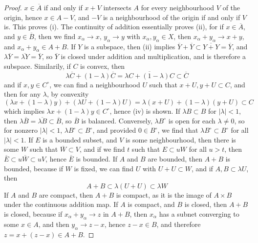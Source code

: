 \begin{proof}
    $x \in \overline{A}$ if and only if $x + V$ intersects $A$ for every neighbourhood $V$ of the origin, hence $x \in A - V$, and $-V$ is a neighbourhood of the origin if and only if $V$ is. This proves (i). The continuity of addition essentially proves (ii), for if $x \in \overline{A}$, and $y \in \overline{B}$, then we find $x_\alpha \to x$, $y_\alpha \to y$ with $x_\alpha, y_\alpha \in X$, then $x_\alpha + y_\alpha \to x + y$, and $x_\alpha + y_\alpha \in A + B$. If $Y$ is a subspace, then (ii) implies $\overline{Y} + \overline{Y} \subset \overline{Y + Y} = \overline{Y}$, and $\lambda \overline{Y} = \overline{\lambda Y} = \overline{Y}$, so $\overline{Y}$ is closed under addition and multiplication, and is therefore a subspace. Similarily, if $C$ is convex, then
    \[ \lambda \overline{C} + (1 - \lambda) \overline{C} = \overline{\lambda C + (1 - \lambda) C} \subset \overline{C} \]
    and if $x,y \in C^\circ$, we can find a neighbourhood $U$ such that $x + U, y + U \subset C$, and then for any $\lambda$, by convexity
    \[ (\lambda x + (1 - \lambda) y) + (\lambda U + (1 - \lambda) U) = \lambda(x + U) + (1 - \lambda)(y + U) \subset C \]
    which implies $\lambda x + (1 - \lambda) y \in C^\circ$, hence (iv) is shown. If $\lambda B \subset B$ for $|\lambda| < 1$, then $\lambda \overline{B} = \overline{\lambda B} \subset \overline{B}$, so $\overline{B}$ is balanced. Conversely, $\lambda B^\circ$ is open for each $\lambda \neq 0$, so for nonzero $|\lambda| < 1$, $\lambda B^\circ \subset B^\circ$, and provided $0 \in B^\circ$, we find that $\lambda B^\circ \subset B^\circ$ for all $|\lambda| < 1$. If $E$ is a bounded subset, and $V$ is some neighbourhood, then there is some $W$ such that $\overline{W} \subset V$, and if we find $t$ such that $E \subset uW$ for all $u > t$, then $\overline{E} \subset u\overline{W} \subset uV$, hence $\overline{E}$ is bounded. If $A$ and $B$ are bounded, then $A + B$ is bounded, because if $W$ is fixed, we can find $U$ with $U + U \subset W$, and if $A,B \subset \lambda U$, then
%
\[ A + B \subset \lambda(U + U) \subset \lambda W \]
%
If $A$ and $B$ are compact, then $A + B$ is compact, as it is the image of $A \times B$ under the continuous addition map. If $A$ is compact, and $B$ is closed, then $A + B$ is closed, because if $x_\alpha + y_\alpha \to z$ in $A + B$, then $x_\alpha$ has a subnet converging to some $x \in A$, and then $y_\alpha \to z - x$, hence $z - x \in B$, and therefore $z = x + (z - x) \in A + B$.
\end{proof}




